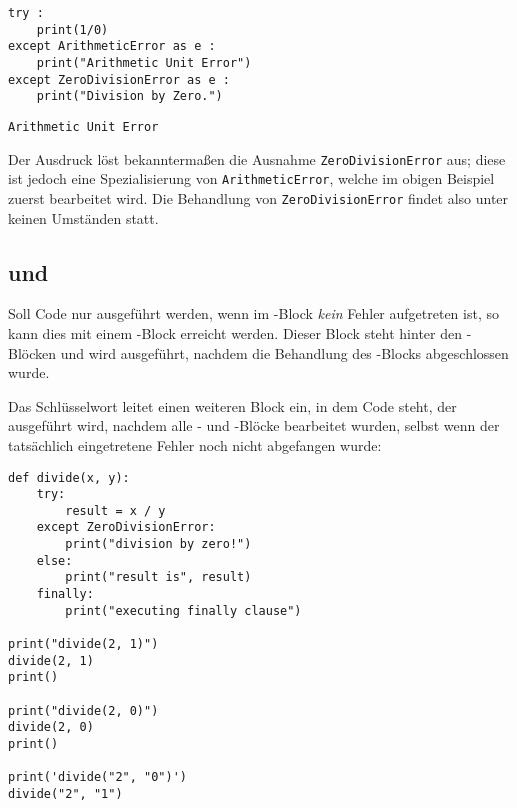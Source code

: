 \begin{codebox}
\begin{verbatim}
try :
    print(1/0)
except ArithmeticError as e :
    print("Arithmetic Unit Error")
except ZeroDivisionError as e :
    print("Division by Zero.")
\end{verbatim}
\end{codebox}

\begin{cmdbox}
\begin{verbatim}
Arithmetic Unit Error
\end{verbatim}
\end{cmdbox}

Der Ausdruck  löst bekanntermaßen die Ausnahme \texttt{ZeroDivisionError} aus; diese ist jedoch eine Spezialisierung von \texttt{ArithmeticError}, welche im obigen Beispiel zuerst bearbeitet wird. Die Behandlung von \texttt{ZeroDivisionError} findet also unter keinen Umständen statt.

\subsection{ und }
Soll Code nur ausgeführt werden, wenn im -Block \emph{kein} Fehler aufgetreten ist, so kann dies mit einem -Block erreicht werden. Dieser Block steht hinter den -Blöcken und wird ausgeführt, nachdem die Behandlung des -Blocks abgeschlossen wurde.

Das Schlüsselwort  leitet einen weiteren Block ein, in dem Code steht, der ausgeführt wird, nachdem alle - und -Blöcke bearbeitet wurden, selbst wenn der tatsächlich eingetretene Fehler noch nicht abgefangen wurde:

\begin{codebox}
\begin{verbatim}
def divide(x, y):
    try:
        result = x / y
    except ZeroDivisionError:
        print("division by zero!")
    else:
        print("result is", result)
    finally:
        print("executing finally clause")

print("divide(2, 1)")
divide(2, 1)
print()

print("divide(2, 0)")
divide(2, 0)
print()

print('divide("2", "0")')
divide("2", "1")
\end{verbatim}
\end{codebox}


